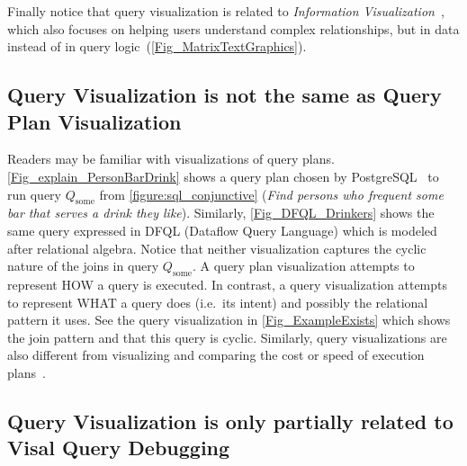 \documentclass[letterpaper,11pt]{article}
\begin{document}
Finally notice that query visualization is related to \emph{Information Visualization}~\cite{Chen:2006vn},
which also focuses on helping users understand complex relationships, 
but in data instead of in query logic~(\autoref{Fig_MatrixTextGraphics}).













\subsection{Query Visualization is not the same as Query Plan Visualization}
\label{sec:queryplans}

Readers may be familiar with visualizations of query plans.
\autoref{Fig_explain_PersonBarDrink} shows a query plan chosen by PostgreSQL~\cite{postgres}
to run query $Q_{\textrm{some}}$ from \autoref{figure:sql_conjunctive} 
(\emph{Find persons who frequent some bar that serves a drink they like}).
Similarly, \autoref{Fig_DFQL_Drinkers} shows the same query expressed 
in DFQL (Dataflow Query Language) \cite{DBLP:journals/iam/ClarkW94} which is modeled after relational algebra.
Notice that neither visualization captures the cyclic nature of the joins in query $Q_{\textrm{some}}$.
%
A query plan visualization attempts to represent HOW a query is executed.
In contrast, a query visualization attempts to represent WHAT a query does (i.e.\ its intent) and possibly the relational pattern it uses.
See the query visualization in \autoref{Fig_ExampleExists} which shows the join pattern and that this query is cyclic.
Similarly, query visualizations are also different from 
visualizing and comparing the cost or speed of execution plans~\cite{DBLP:journals/pvldb/Haritsa10}. 










\subsection{Query Visualization is only partially related to Visal Query Debugging} 
\label{sec:querydebugging}

%
\end{document}
